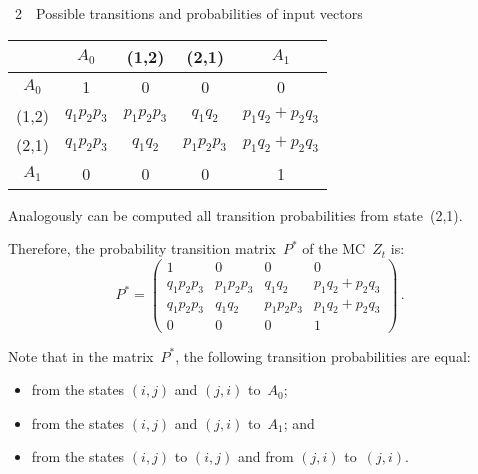 \begin{multicols}{2}
\begin{center} %
{{\tablename~2}\ \ \small{Possible transitions and probabilities of input vectors}}
\vspace*{2ex}

{\small
\tabcolsep=8.6pt
\begin{tabular}{ccccc}
\hline
       &   $A_0$  &    (1,2)   &   (2,1)   &   $A_1$    \\
\hline
$A_0$  &     1    &      0   &     0    &     0     \\
(1,2)  & $q_1p_2p_3$ & $p_1p_2p_3$ & $q_1q_2$ & $p_1q_2+p_2q_3$      \\
(2,1)  & $q_1p_2p_3$ & $q_1q_2$ & $p_1p_2p_3$ & $p_1q_2+p_2q_3$      \\
$A_1$  &    0      &    0      &    0      &    1         \\
\hline
\end{tabular}
}
\end{center}

\vspace*{6pt}

\bigskip
\setcounter{table}{2}


Analogously can be computed all transition probabilities
from state~(2,1).

Therefore, the probability transition matrix~$P^*$ of
the MC~$Z_t$ is:
$$
P^*
=
\begin{pmatrix}
1         &   0       &   0       &   0              \\
q_1p_2p_3 & p_1p_2p_3 & q_1q_2    &  p_1q_2+p_2q_3   \\
q_1p_2p_3 & q_1q_2    & p_1p_2p_3 &  p_1q_2+p_2q_3   \\
0         &   0       & 0         &   1
\end{pmatrix}
\,.
$$

Note that in the matrix~$P^*$, the following
transition probabilities are equal:
\begin{itemize}
\item from the states $(i,j)$ and $(j,i)$ to~$A_0$;
\item
from the states $(i,j)$ and $(j,i)$ to~$A_1$; and
\item
from the states $(i,j)$ to $(i,j)$
and from $(j,i)$ to~$(j,i)$.
\end{itemize}



\begin{table*}\small %
\begin{center}
\vspace*{2ex}


\end{center}
\end{table*}
\end{multicols}

